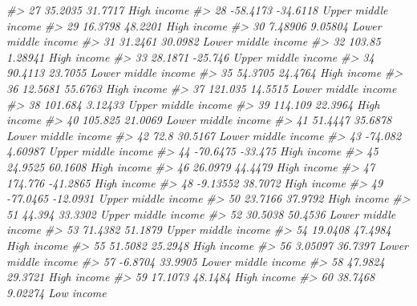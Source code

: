 \documentclass[
  xelatex, ja=standard]{bxjsbook}
\newenvironment{Shaded}{\begin{snugshade}}{\end{snugshade}}
\newcommand{\CommentTok}[1]{\textcolor[rgb]{0.56,0.35,0.01}{\textit{#1}}}
\theoremstyle{definition}
\theoremstyle{definition}
\theoremstyle{definition}
\theoremstyle{definition}
\theoremstyle{remark}
\begin{document}
\begin{Shaded}
\begin{Highlighting}[]
\CommentTok{\#\textgreater{} 27     35.2035    31.7717         High income}
\CommentTok{\#\textgreater{} 28    {-}58.4173   {-}34.6118 Upper middle income}
\CommentTok{\#\textgreater{} 29     16.3798    48.2201         High income}
\CommentTok{\#\textgreater{} 30     7.48906    9.05804 Lower middle income}
\CommentTok{\#\textgreater{} 31     31.2461    30.0982 Lower middle income}
\CommentTok{\#\textgreater{} 32      103.85    1.28941         High income}
\CommentTok{\#\textgreater{} 33     28.1871    {-}25.746 Upper middle income}
\CommentTok{\#\textgreater{} 34     90.4113    23.7055 Lower middle income}
\CommentTok{\#\textgreater{} 35     54.3705    24.4764         High income}
\CommentTok{\#\textgreater{} 36     12.5681    55.6763         High income}
\CommentTok{\#\textgreater{} 37     121.035    14.5515 Lower middle income}
\CommentTok{\#\textgreater{} 38     101.684    3.12433 Upper middle income}
\CommentTok{\#\textgreater{} 39     114.109    22.3964         High income}
\CommentTok{\#\textgreater{} 40     105.825    21.0069 Lower middle income}
\CommentTok{\#\textgreater{} 41     51.4447    35.6878 Lower middle income}
\CommentTok{\#\textgreater{} 42        72.8    30.5167 Lower middle income}
\CommentTok{\#\textgreater{} 43     {-}74.082    4.60987 Upper middle income}
\CommentTok{\#\textgreater{} 44    {-}70.6475    {-}33.475         High income}
\CommentTok{\#\textgreater{} 45     24.9525    60.1608         High income}
\CommentTok{\#\textgreater{} 46     26.0979    44.4479         High income}
\CommentTok{\#\textgreater{} 47     174.776   {-}41.2865         High income}
\CommentTok{\#\textgreater{} 48    {-}9.13552    38.7072         High income}
\CommentTok{\#\textgreater{} 49    {-}77.0465   {-}12.0931 Upper middle income}
\CommentTok{\#\textgreater{} 50     23.7166    37.9792         High income}
\CommentTok{\#\textgreater{} 51      44.394    33.3302 Upper middle income}
\CommentTok{\#\textgreater{} 52     30.5038    50.4536 Lower middle income}
\CommentTok{\#\textgreater{} 53     71.4382    51.1879 Upper middle income}
\CommentTok{\#\textgreater{} 54     19.0408    47.4984         High income}
\CommentTok{\#\textgreater{} 55     51.5082    25.2948         High income}
\CommentTok{\#\textgreater{} 56     3.05097    36.7397 Lower middle income}
\CommentTok{\#\textgreater{} 57     {-}6.8704    33.9905 Lower middle income}
\CommentTok{\#\textgreater{} 58     47.9824    29.3721         High income}
\CommentTok{\#\textgreater{} 59     17.1073    48.1484         High income}
\CommentTok{\#\textgreater{} 60     38.7468    9.02274          Low income}

\end{Highlighting}
\end{Shaded}
\end{document}
